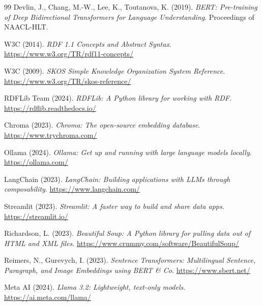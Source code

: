 \documentclass[12pt, a4paper, twoside]{report}
\begin{document}
\begin{thebibliography}{99}
Devlin, J., Chang, M.-W., Lee, K., Toutanova, K. (2019).
\textit{BERT: Pre-training of Deep Bidirectional Transformers for Language Understanding}.
Proceedings of NAACL-HLT.

W3C (2014).
\textit{RDF 1.1 Concepts and Abstract Syntax}.
\url{https://www.w3.org/TR/rdf11-concepts/}

W3C (2009).
\textit{SKOS Simple Knowledge Organization System Reference}.
\url{https://www.w3.org/TR/skos-reference/}

RDFLib Team (2024).
\textit{RDFLib: A Python library for working with RDF}.
\url{https://rdflib.readthedocs.io/}

Chroma (2023).
\textit{Chroma: The open-source embedding database}.
\url{https://www.trychroma.com/}

Ollama (2024).
\textit{Ollama: Get up and running with large language models locally}.
\url{https://ollama.com/}

LangChain (2023).
\textit{LangChain: Building applications with LLMs through composability}.
\url{https://www.langchain.com/}

Streamlit (2023).
\textit{Streamlit: A faster way to build and share data apps}.
\url{https://streamlit.io/}

Richardson, L. (2023).
\textit{Beautiful Soup: A Python library for pulling data out of HTML and XML files}.
\url{https://www.crummy.com/software/BeautifulSoup/}

Reimers, N., Gurevych, I. (2023).
\textit{Sentence Transformers: Multilingual Sentence, Paragraph, and Image Embeddings using BERT \& Co.}
\url{https://www.sbert.net/}

Meta AI (2024).
\textit{Llama 3.2: Lightweight, text-only models}.
\url{https://ai.meta.com/llama/}

\end{thebibliography}
\end{document}
